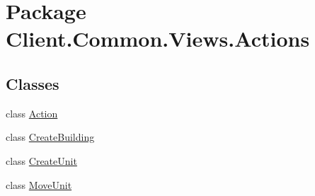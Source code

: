 \hypertarget{namespaceClient_1_1Common_1_1Views_1_1Actions}{\section{Package Client.\-Common.\-Views.\-Actions}
\label{namespaceClient_1_1Common_1_1Views_1_1Actions}
}
\subsection*{Classes}
\begin{DoxyCompactItemize}
\item 
class \hyperlink{classClient_1_1Common_1_1Views_1_1Actions_1_1Action}{Action}
\item 
class \hyperlink{classClient_1_1Common_1_1Views_1_1Actions_1_1CreateBuilding}{Create\-Building}
\item 
class \hyperlink{classClient_1_1Common_1_1Views_1_1Actions_1_1CreateUnit}{Create\-Unit}
\item 
class \hyperlink{classClient_1_1Common_1_1Views_1_1Actions_1_1MoveUnit}{Move\-Unit}
\end{DoxyCompactItemize}

